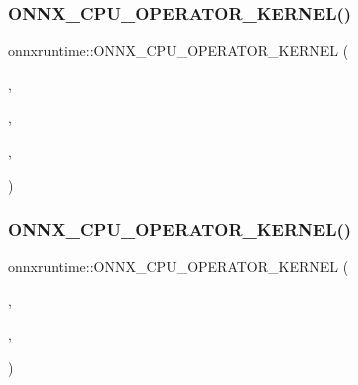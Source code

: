 \subsubsection{\texorpdfstring{O\+N\+N\+X\+\_\+\+C\+P\+U\+\_\+\+O\+P\+E\+R\+A\+T\+O\+R\+\_\+\+K\+E\+R\+N\+E\+L()}{ONNX\_CPU\_OPERATOR\_KERNEL()}\hspace{0.1cm}{\footnotesize\ttfamily [61/72]}}
{\footnotesize\ttfamily onnxruntime\+::\+O\+N\+N\+X\+\_\+\+C\+P\+U\+\_\+\+O\+P\+E\+R\+A\+T\+O\+R\+\_\+\+K\+E\+R\+N\+EL (\begin{DoxyParamCaption}\item[{\mbox{\hyperlink{classonnxruntime_1_1AveragePool}{Average\+Pool}}}]{,  }\item[{7}]{,  }\item[{\mbox{\hyperlink{classonnxruntime_1_1KernelDefBuilder}{Kernel\+Def\+Builder}}().Type\+Constraint(\char`\"{}T\char`\"{}, Data\+Type\+Impl\+::\+Get\+Tensor\+Type$<$ float $>$())}]{,  }\item[{\mbox{\hyperlink{classonnxruntime_1_1Pool}{Pool}}$<$ float, \mbox{\hyperlink{classonnxruntime_1_1AveragePool}{Average\+Pool}} $>$}]{ }\end{DoxyParamCaption})}

\mbox{\label{namespaceonnxruntime_a9b145509d52952763359cc9fdb6f674a}} 
\subsubsection{\texorpdfstring{O\+N\+N\+X\+\_\+\+C\+P\+U\+\_\+\+O\+P\+E\+R\+A\+T\+O\+R\+\_\+\+K\+E\+R\+N\+E\+L()}{ONNX\_CPU\_OPERATOR\_KERNEL()}\hspace{0.1cm}{\footnotesize\ttfamily [62/72]}}
{\footnotesize\ttfamily onnxruntime\+::\+O\+N\+N\+X\+\_\+\+C\+P\+U\+\_\+\+O\+P\+E\+R\+A\+T\+O\+R\+\_\+\+K\+E\+R\+N\+EL (\begin{DoxyParamCaption}\item[{\mbox{\hyperlink{classonnxruntime_1_1MaxPool}{Max\+Pool}}}]{,  }\item[{8}]{,  }\item[{\mbox{\hyperlink{classonnxruntime_1_1KernelDefBuilder}{Kernel\+Def\+Builder}}().Type\+Constraint(\char`\"{}T\char`\"{}, Data\+Type\+Impl\+::\+Get\+Tensor\+Type$<$ float $>$()).Type\+Constraint(\char`\"{}I\char`\"{}, Data\+Type\+Impl\+::\+Get\+Tensor\+Type$<$ int64\+\_\+t $>$())}]{ }\end{DoxyParamCaption})}

